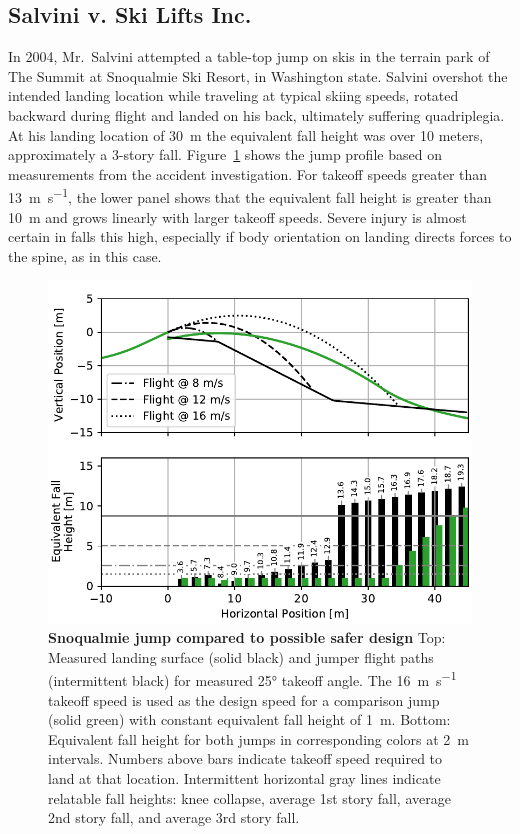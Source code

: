 \documentclass[smallextended]{svjour3}       %
\begin{document}
\subsection{Salvini v. Ski Lifts Inc.}
\label{sec:salvini}
%
In 2004, Mr.~Salvini attempted a table-top jump on skis in the terrain park of
The Summit at Snoqualmie Ski Resort, in Washington state. Salvini overshot the
intended landing location while traveling at typical skiing speeds, rotated
backward during flight and landed on his back, ultimately suffering
quadriplegia. At his landing location of 30~\si{\meter} the equivalent fall
height was over 10 meters, approximately a 3-story fall.
Figure~\ref{fig:salvini-v-snoqualmie} shows the jump profile based on
measurements from the accident investigation.  For takeoff speeds greater than
13~\si{\meter\per\second}, the lower panel shows that the equivalent fall
height is greater than 10~\si{\meter} and grows linearly with larger takeoff
speeds. Severe injury is almost certain in falls this high, especially if
body orientation on landing directs forces to the spine, as in this case.
%
\begin{figure}
  \centering
  \includegraphics[width=5.25in]{figures/salvini-v-snoqualmie.pdf}
  \caption{\textbf{Snoqualmie jump compared to possible safer design}
  Top: Measured landing surface (solid black) and jumper flight paths
  (intermittent black) for measured 25\si{\degree} takeoff angle. The
  16~\si{\meter\per\second} takeoff speed is used as the design speed for a
  comparison jump (solid green) with constant equivalent fall height of
  1~\si{\meter}.
  Bottom: Equivalent fall height for both jumps in corresponding colors
  at 2~\si{\meter} intervals. Numbers above bars indicate takeoff speed
  required to land at that location.
  Intermittent horizontal gray lines indicate relatable fall heights: knee
  collapse, average 1st story fall, average 2nd story fall, and average 3rd
  story fall.
  }
  \label{fig:salvini-v-snoqualmie}
\end{figure}
\end{document}
